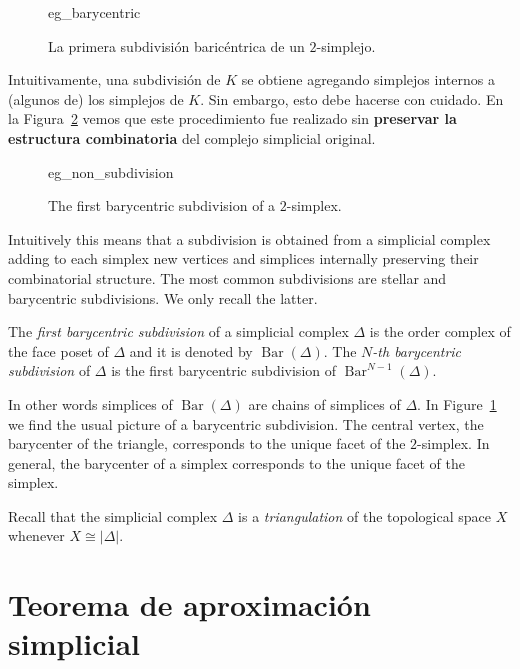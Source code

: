 \documentclass{standalone}
\begin{document}
	\begin{figure}
		\centering
		{eg_barycentric}
		\caption{La primera subdivisión baricéntrica de un $2$-simplejo.}
		\label{fig:eg_barycentric}
	\end{figure}
	
	Intuitivamente, una subdivisión de $K$ se obtiene agregando simplejos internos a (algunos de) los simplejos de $K$. Sin embargo, esto debe hacerse con cuidado. En la Figura~\ref{fig:eg_non_subdivision} vemos que este procedimiento fue realizado sin \textbf{preservar la estructura combinatoria} del complejo simplicial original.
	
	\begin{figure}
		\centering
		{eg_non_subdivision}
		\caption{The first barycentric subdivision of a $2$-simplex.}
		\label{fig:eg_non_subdivision}
	\end{figure}

	Intuitively this means that a subdivision is obtained from a simplicial complex adding to each simplex new vertices and simplices internally preserving their combinatorial structure. The most common subdivisions are stellar and barycentric subdivisions. We only recall the latter.
	
	\begin{definition}\label{def:barycentric_subdivision}
		The \emph{first barycentric subdivision} of a simplicial complex $\Delta$ is the order complex of the face poset of $\Delta$ and it is denoted by $\operatorname{Bar}(\Delta)$. The \emph{$N$-th barycentric subdivision} of $\Delta$ is the first barycentric subdivision of $\operatorname{Bar}^{N-1}(\Delta)$.
	\end{definition}
	In other words simplices of $\operatorname{Bar}(\Delta)$ are chains of simplices of $\Delta$. In Figure~\ref{fig:eg_barycentric} we find the usual picture of a barycentric subdivision. The central vertex, the barycenter of the triangle, corresponds to the unique facet of the $2$-simplex. In general, the barycenter of a simplex corresponds to the unique facet of the simplex.
	
	
	Recall that the simplicial complex $\Delta$ is a \emph{triangulation} of the topological space $X$ whenever $X\cong|\Delta|$.
	
	\section{Teorema de aproximación simplicial}
	
\end{document}
